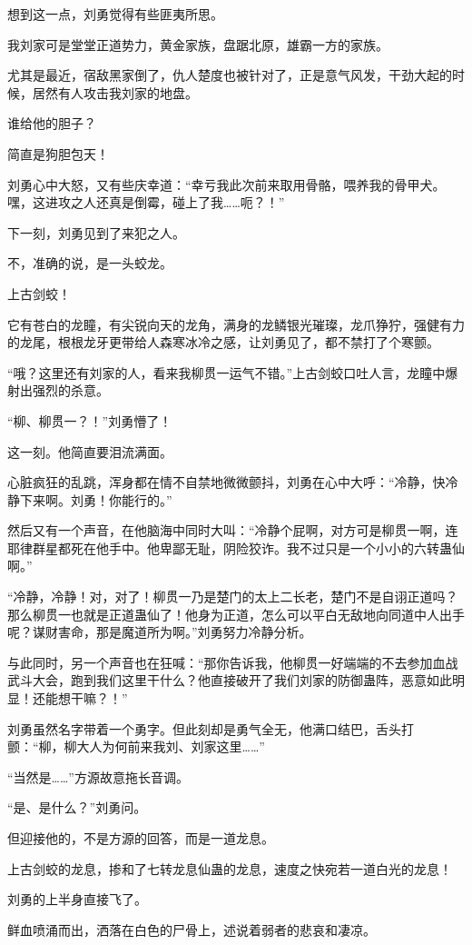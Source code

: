 \begin{this_body}
想到这一点，刘勇觉得有些匪夷所思。

我刘家可是堂堂正道势力，黄金家族，盘踞北原，雄霸一方的家族。

尤其是最近，宿敌黑家倒了，仇人楚度也被针对了，正是意气风发，干劲大起的时候，居然有人攻击我刘家的地盘。

谁给他的胆子？

简直是狗胆包天！

刘勇心中大怒，又有些庆幸道：“幸亏我此次前来取用骨骼，喂养我的骨甲犬。嘿，这进攻之人还真是倒霉，碰上了我……呃？！”

下一刻，刘勇见到了来犯之人。

不，准确的说，是一头蛟龙。

上古剑蛟！

它有苍白的龙瞳，有尖锐向天的龙角，满身的龙鳞银光璀璨，龙爪狰狞，强健有力的龙尾，根根龙牙更带给人森寒冰冷之感，让刘勇见了，都不禁打了个寒颤。

“哦？这里还有刘家的人，看来我柳贯一运气不错。”上古剑蛟口吐人言，龙瞳中爆射出强烈的杀意。

“柳、柳贯一？！”刘勇懵了！

这一刻。他简直要泪流满面。

心脏疯狂的乱跳，浑身都在情不自禁地微微颤抖，刘勇在心中大呼：“冷静，快冷静下来啊。刘勇！你能行的。”

然后又有一个声音，在他脑海中同时大叫：“冷静个屁啊，对方可是柳贯一啊，连耶律群星都死在他手中。他卑鄙无耻，阴险狡诈。我不过只是一个小小的六转蛊仙啊。”

“冷静，冷静！对，对了！柳贯一乃是楚门的太上二长老，楚门不是自诩正道吗？那么柳贯一也就是正道蛊仙了！他身为正道，怎么可以平白无敌地向同道中人出手呢？谋财害命，那是魔道所为啊。”刘勇努力冷静分析。

与此同时，另一个声音也在狂喊：“那你告诉我，他柳贯一好端端的不去参加血战武斗大会，跑到我们这里干什么？他直接破开了我们刘家的防御蛊阵，恶意如此明显！还能想干嘛？！”

刘勇虽然名字带着一个勇字。但此刻却是勇气全无，他满口结巴，舌头打颤：“柳，柳大人为何前来我刘、刘家这里……”

“当然是……”方源故意拖长音调。

“是、是什么？”刘勇问。

但迎接他的，不是方源的回答，而是一道龙息。

上古剑蛟的龙息，掺和了七转龙息仙蛊的龙息，速度之快宛若一道白光的龙息！

刘勇的上半身直接飞了。

鲜血喷涌而出，洒落在白色的尸骨上，述说着弱者的悲哀和凄凉。


\end{this_body}
